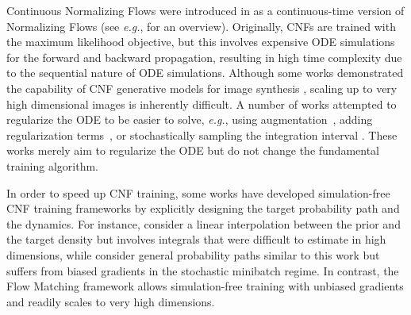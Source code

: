 \documentclass{article}
\makeatletter
\newcommand{\eg}{{e.g.}}
\renewcommand*{\eg}{{\it e.g.}\@\xspace}
\makeatother
\begin{document}
Continuous Normalizing Flows were introduced in \citep{chen2018neural} as a continuous-time version of Normalizing Flows (see \eg, \citet{kobyzev2020normalizing,papamakarios2021normalizing} for an overview). Originally, CNFs are trained with the maximum likelihood objective, but this involves expensive ODE simulations for the forward and backward propagation, resulting in high time complexity due to the sequential nature of ODE simulations. Although some works demonstrated the capability of CNF generative models for image synthesis \citep{ffjord2018}, scaling up to very high dimensional images is inherently difficult. %
%
A number of works attempted to regularize the ODE to be easier to solve, \eg, using augmentation~\citep{dupont2019aug}, adding regularization terms~\citep{yang2019potential,finlay2020how,onken2021ot-flow,tong2020trajectorynet,kelly2020learning}, or stochastically sampling the integration interval \citep{du2022toflow}. These works merely aim to regularize the ODE but do not change the fundamental training algorithm.

In order to speed up CNF training, some works have developed simulation-free CNF training frameworks by explicitly designing the target probability path and the dynamics. For instance, \citet{rozen2021moser} consider a linear interpolation between the prior and the target density but involves integrals that were difficult to estimate in high dimensions, while \citet{ben2022matching} consider general probability paths similar to this work but suffers from biased gradients in the stochastic minibatch regime.
In contrast, the Flow Matching framework allows simulation-free training with unbiased gradients and readily scales to very high dimensions.
\end{document}

